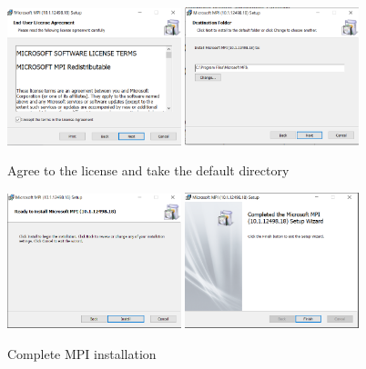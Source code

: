 \begin{figure}[H]
\begin{center}
\includegraphics[width=0.45\textwidth]{mpi-2}
\includegraphics[width=0.45\textwidth]{mpi-3}
\caption{Agree to the license and take the default directory}\label{fg:installer-10}
\end{center}
\end{figure}

\begin{figure}[H]
\begin{center}
\includegraphics[width=0.45\textwidth]{mpi-4}
\includegraphics[width=0.45\textwidth]{mpi-5}
\caption{Complete MPI installation}\label{fg:installer-11}
\end{center}
\end{figure}

